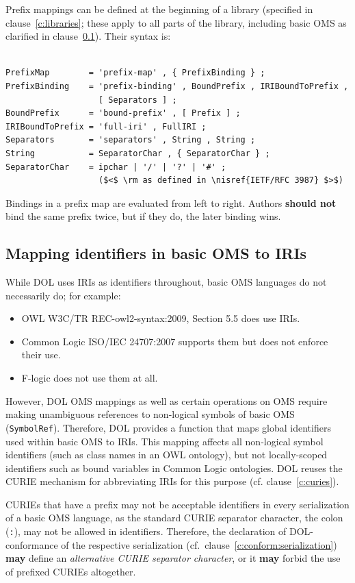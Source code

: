 \documentclass[10pt,fleqn,%
\ifpretendfinal
final%
\else
draft%
\fi,
]{scrreprt}
\makeatletter
\newcommand*{\cf}{cf.\@\xspace}
\newcommand*\CommentAuthor{}
\renewcommand*\CommentAuthor{#1}}
\newcommand*\CommentDate{}
\renewcommand*\CommentDate{#1}}
\newcommand*\CommentId{}
\renewcommand*\CommentId{#1}}
\newcommand*\CommentType{}
\renewcommand*\CommentType{#1}}
\newcommand*{\SetCommentColorByType}[1]{%
\edef\localType{{#1}}%
\expandafter\ifstrequal\localType{q-aut}{\colorlet{CommentColor}{red}}{%
\expandafter\ifstrequal\localType{q-all}{\colorlet{CommentColor}{orange}}{%
\expandafter\ifstrequal\localType{todo}{\colorlet{CommentColor}{orange}}{%
\expandafter\ifstrequal\localType{fyi}{\colorlet{CommentColor}{lightgray}}{%
\colorlet{CommentColor}{yellow}}}}}}
\newcommand*{\SetCommentPrefixByType}[1]{%
\edef\localType{{#1}}%
\expandafter\@ifmtarg\localType{%
\edef\CommentPrefix{}%
}{%
\caseupper[q]{#1}%
\edef\CommentPrefix{\thestring: }%
}}
\newcommand*{\initComment}[1]{%
\setkeys{Comment}{#1}%
\SetCommentColorByType{\CommentType}%
\relax%
\SetCommentPrefixByType{\CommentType}%
\relax%
}
\newcommand*{\todonote}[2][]{%
\initComment{#1}%
\pdfcomment[author=\CommentAuthor,color=CommentColor,date=\CommentDate,id=\CommentId]{%
\CommentPrefix
#2}}
\renewcommand*{\todonote}[2][]{%
\initComment{#1}%
\ednote{\CommentPrefix #2}}
\newcommand*{\CLnote}[2][author=Christoph Lange]{%
\todonote[author=Christoph Lange,#1]{#2} 
}
\newcommand*{\syntax}[1]{\texttt{#1}}
\newcommand*{\shouldnot}{\textbf{should not}\xspace}
\newcommand*{\may}{\textbf{may}\xspace}
\newcommand{\clauserefname}{clause}
\newcommand{\cref}[1]{\clauserefname~\ref{#1}}
\newcommand{\ssclause}[1]{\subsection{#1}}
\newcommand{\nisref}[1]{#1}
\makeatother
\begin{document}
Prefix mappings can be defined at the beginning of a library (specified in \cref{c:libraries}; 
these apply to all parts of the library, including basic OMS as clarified in \cref{c:map-ids}).  
Their syntax is:
\begin{lstlisting}[language=ebnf,escapeinside={()}]  % abstract syntax

PrefixMap        = 'prefix-map' , { PrefixBinding } ;
PrefixBinding    = 'prefix-binding' , BoundPrefix , IRIBoundToPrefix ,
                   [ Separators ] ;
BoundPrefix      = 'bound-prefix' , [ Prefix ] ;
IRIBoundToPrefix = 'full-iri' , FullIRI ;
Separators       = 'separators' , String , String ;
String           = SeparatorChar , { SeparatorChar } ;
SeparatorChar    = ipchar | '/' | '?' | '#' ;
                   ($<$ \rm as defined in \nisref{IETF/RFC 3987} $>$)
\end{lstlisting}

Bindings in a prefix map are evaluated from left to right.  Authors \shouldnot bind the same prefix twice, but if they do, the later binding wins.

\ssclause{Mapping identifiers in basic OMS to IRIs}\label{c:map-ids}

While DOL uses IRIs as identifiers throughout, basic OMS languages do not necessarily do; for example:
\begin{itemize}
\item OWL \nisref{W3C/TR REC-owl2-syntax:2009, Section 5.5} does use IRIs.
\item Common Logic \nisref{ISO/IEC 24707:2007} supports them but does not enforce their use.
\item F-logic \cite{flogic} does not use them at all.
\end{itemize}
However, DOL OMS mappings as well as 
certain operations on OMS require making unambiguous references to non-logical symbols of basic OMS (\syntax{SymbolRef}).  Therefore, DOL provides a function that maps global identifiers used within basic OMS to IRIs.  This mapping affects all non-logical symbol identifiers (such as class names in an OWL ontology), but not locally-scoped identifiers such as bound variables in Common Logic ontologies.  DOL reuses the CURIE mechanism for abbreviating IRIs for this purpose (\cf \cref{c:curies}).

CURIEs that have a prefix may not be acceptable identifiers in every serialization of a basic OMS language,
as the standard CURIE separator character, the colon (\syntax{:}), may not be allowed in identifiers.  
Therefore, the declaration of DOL-conformance of the respective serialization (cf.\ \cref{c:conform:serialization}) \may define an \emph{alternative CURIE separator character}, or it \may forbid the use of prefixed CURIEs altogether.
\end{document}
